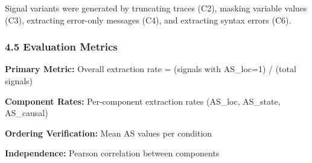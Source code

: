 Signal variants were generated by truncating traces (C2), masking variable values (C3), extracting error-only messages (C4), and extracting syntax errors (C6).

\subsubsection{4.5 Evaluation Metrics}

\textbf{Primary Metric:} Overall extraction rate = (signals with AS\_loc=1) / (total signals)

\textbf{Component Rates:} Per-component extraction rates (AS\_loc, AS\_state, AS\_causal)

\textbf{Ordering Verification:} Mean AS values per condition

\textbf{Independence:} Pearson correlation between components

